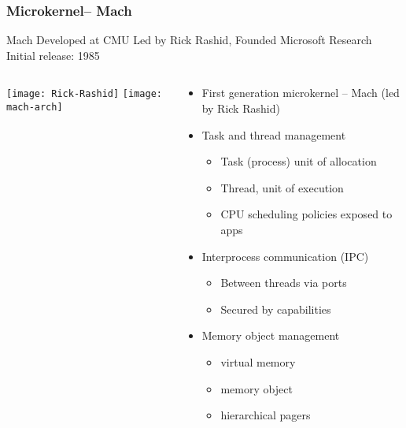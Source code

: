 \begin{frame}[plain]
	\frametitle{Microkernel-- Mach}

Mach Developed  at CMU
Led by Rick Rashid, Founded Microsoft Research
Initial  release: 1985

	
	
	\begin{columns}
		
		\begin{column}{.4\textwidth}
			\centering
			\texttt{[image: Rick-Rashid]}
			\texttt{[image: mach-arch]}
		\end{column}
		
		\begin{column}{.6\textwidth}
			
			\begin{itemize}
				\item First generation microkernel -- Mach (led by Rick Rashid)
				\item Task and thread management
				\begin{itemize}
					\item Task (process) unit of allocation
					\item Thread, unit of execution
					\item CPU scheduling policies exposed to apps
				\end{itemize}	
				\item Interprocess communication (IPC)
				\begin{itemize}
					\item Between threads via ports
					\item Secured by capabilities

				\end{itemize}				
				
				\item Memory object management
				\begin{itemize}
					\item virtual memory
					\item memory object
					\item hierarchical pagers
					
				\end{itemize}		
			\end{itemize}	
	
		\end{column}
		
		
	\end{columns}
	
\end{frame}


